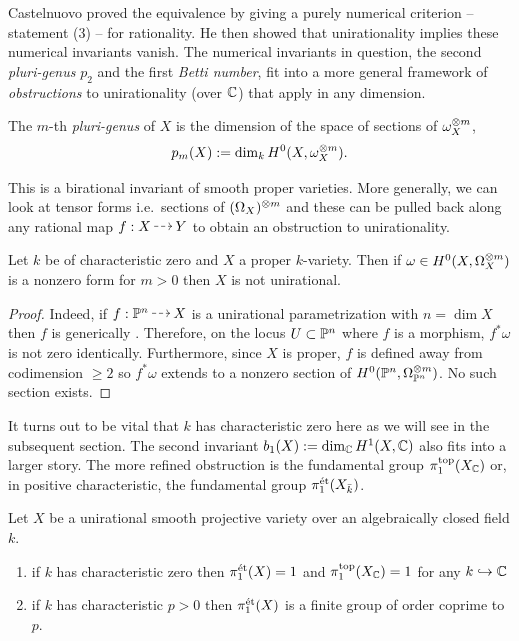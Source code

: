 \documentclass[main.tex]{subfiles}
\begin{document}
Castelnuovo proved the equivalence by giving a purely numerical criterion -- statement (3) -- for rationality. He then showed that unirationality implies these numerical invariants vanish. The numerical invariants in question, the second \textit{pluri-genus} $p_2$ and the first \textit{Betti number}, fit into a more general framework of \textit{obstructions} to unirationality (over $\CC$) that apply in any dimension. 

\begin{defn}
The $m$-th \textit{pluri-genus} of $X$ is the dimension of the space of sections of $\omega_X^{\ot m}$,
\[ p_m(X) := \dim_{k} H^0(X, \omega_X^{\ot m}). \]
\end{defn}

This is a birational invariant of smooth proper varieties. More generally, we can look at tensor forms i.e.\ sections of $(\Omega_X)^{\ot m}$ and these can be pulled back along any rational map $f : X \rat Y$ to obtain an obstruction to unirationality.

\begin{prop} \label{prop:tensor_forms_obstruction}
Let $k$ be of characteristic zero and $X$ a proper $k$-variety. Then if $\omega \in H^0(X, \Omega_X^{\ot m})$ is a nonzero form for $m > 0$ then $X$ is not unirational.
\end{prop}

\begin{proof}
Indeed, if $f : \P^n \rat X$ is a unirational parametrization with $n = \dim{X}$ then $f$ is generically \etale. Therefore, on the locus $U \subset \P^n$ where $f$ is a morphism, $f^* \omega$ is not zero identically. Furthermore, since $X$ is proper, $f$ is defined away from codimension $\ge 2$ so $f^* \omega$ extends to a nonzero section of $H^0(\P^n, \Omega_{\P^n}^{\ot m})$. No such section exists.
\end{proof}

It turns out to be vital that $k$ has characteristic zero here as we will see in the subsequent section. The second invariant $b_1(X) := \dim_{\CC} H^1(X, \CC)$ also fits into a larger story. The more refined obstruction is the fundamental group $\pi_1^{\mathrm{top}}(X_{\CC})$ or, in positive characteristic, the \etale fundamental group $\pi_1^{\et}(X_{\bar{k}})$. 

\begin{theorem} \label{thm:unirational_fundamental_group}
Let $X$ be a unirational smooth projective variety over an algebraically closed field $k$.
\begin{enumerate}
\item if $k$ has characteristic zero then $\pi_1^{\et}(X) = 1$ and $\pi_1^{\mathrm{top}}(X_{\CC}) = 1$ for any $k \embed \CC$ 
\item if $k$ has characteristic $p > 0$ then $\pi_1^{\et}(X)$ is a finite group of order coprime to $p$.
\end{enumerate}
\end{theorem}
\end{document}

